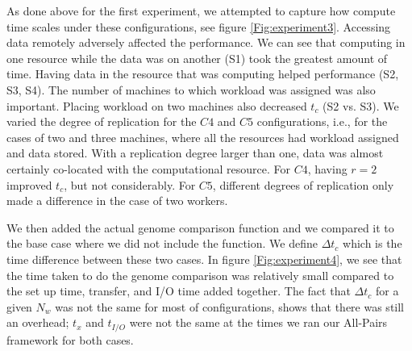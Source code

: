 \documentclass{rspublic}
\begin{document}
As done above for the first experiment, we attempted to capture how
compute time scales under these configurations, see figure
\ref{Fig:experiment3}. Accessing data remotely adversely affected the
performance. We can see that computing in one resource while the data
was on another (S1) took the greatest amount of time. Having data in the
resource that was computing helped performance (S2, S3, S4). The number
of machines to which workload was assigned was also important. Placing
workload on two machines also decreased $t_c$ (S2 vs. S3). We varied the
degree of replication for the $C4$ and $C5$ configurations, i.e., for
the cases of two and three machines, where all the resources had
workload assigned and data stored. With a replication degree larger than
one, data was almost certainly co-located with the computational
resource. For $C4$, having $r = 2$ improved $t_c$, but not considerably.
For $C5$, different degrees of replication only made a difference in the
case of two workers.

We then added the actual genome comparison function and we compared it
to the base case where we did not include the function. We define $\Delta t_c$
which is the time difference between these two cases. In figure
\ref{Fig:experiment4}, we see that the time taken to do the genome
comparison was relatively small compared to the set up time, transfer,
and I/O time added together. The fact that $\Delta t_c$ for a given
$N_w$ was not the same for most of configurations, shows that there was
still an overhead; $t_x$ and $t_{I/O}$ were not the same at the
times we ran our All-Pairs framework for both cases.
\end{document}
